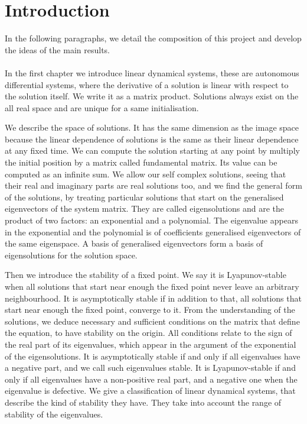 \chapter*{Introduction}
 
In the following paragraphs, we detail the composition of this project and develop the ideas of the main results.
\\\\
In the first chapter we introduce linear dynamical systems, these are autonomous differential systems, where the derivative of a solution is linear with respect to the solution itself. We write it as a matrix product. Solutions always exist on the all real space and are unique for a same initialisation.

We describe the space of solutions. It has the same dimension as the image space because the linear dependence of solutions is the same as their linear dependence at any fixed time. We can compute the solution starting at any point by multiply the initial position by a matrix called fundamental matrix. Its value can be computed as an infinite sum. We allow our self complex solutions, seeing that their real and imaginary parts are real solutions too, and we find the general form of the solutions, by treating particular solutions that start on the generalised eigenvectors of the system matrix. They are called eigensolutions and are the product of two factors: an exponential and a polynomial. The eigenvalue appears in the exponential and the polynomial is of coefficients generalised eigenvectors of the same eigenspace. A basis of generalised eigenvectors form a basis of eigensolutions for the solution space.

Then we introduce the stability of a fixed point. We say it is Lyapunov-stable when all solutions that start near enough the fixed point never leave an arbitrary neighbourhood. It is asymptotically stable if in addition to that, all solutions that start near enough the fixed point, converge to it. From the understanding of the solutions, we deduce necessary and sufficient conditions on the matrix that define the equation, to have stability on the origin. All conditions relate to the sign of the real part of its eigenvalues, which appear in the argument of the exponential of the eigensolutions. It is asymptotically stable if and only if all eigenvalues have a negative part, and we call such eigenvalues stable. It is Lyapunov-stable if and only if all eigenvalues have a non-positive real part, and a negative one when the eigenvalue is defective. We give a classification of linear dynamical systems, that describe the kind of stability they have. They take into account the range of stability of the eigenvalues.

